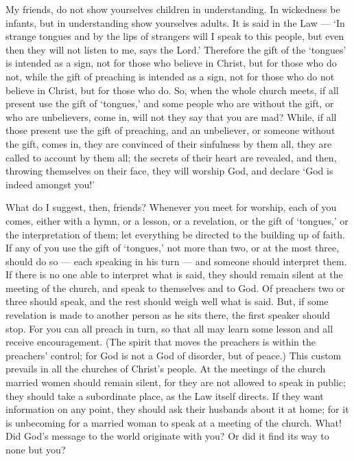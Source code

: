  My friends, do not show yourselves children in
understanding. In wickedness be infants, but in understanding show
yourselves adults.  It is said in the Law --- `In strange
tongues and by the lips of strangers will I speak to this people, but
even then they will not listen to me, says the Lord.' 
Therefore the gift of the `tongues' is intended as a sign, not for those
who believe in Christ, but for those who do not, while the gift of
preaching is intended as a sign, not for those who do not believe in
Christ, but for those who do.  So, when the whole church
meets, if all present use the gift of `tongues,' and some people who are
without the gift, or who are unbelievers, come in, will not they say
that you are mad?  While, if all those present use the gift
of preaching, and an unbeliever, or someone without the gift, comes in,
they are convinced of their sinfulness by them all, they are called to
account by them all;  the secrets of their heart are
revealed, and then, throwing themselves on their face, they will worship
God, and declare `God is indeed amongst you!'

 What do I suggest, then, friends? Whenever you meet for
worship, each of you comes, either with a hymn, or a lesson, or a
revelation, or the gift of `tongues,' or the interpretation of them; let
everything be directed to the building up of faith.  If any
of you use the gift of `tongues,' not more than two, or at the most
three, should do so --- each speaking in his turn --- and someone should
interpret them.  If there is no one able to interpret what
is said, they should remain silent at the meeting of the church, and
speak to themselves and to God.  Of preachers two or three
should speak, and the rest should weigh well what is said. 
But, if some revelation is made to another person as he sits there, the
first speaker should stop.  For you can all preach in turn,
so that all may learn some lesson and all receive encouragement.
 (The spirit that moves the preachers is within the
preachers' control;  for God is not a God of disorder, but
of peace.) This custom prevails in all the churches of Christ's people.
 At the meetings of the church married women should remain
silent, for they are not allowed to speak in public; they should take a
subordinate place, as the Law itself directs.  If they want
information on any point, they should ask their husbands about it at
home; for it is unbecoming for a married woman to speak at a meeting of
the church.  What! Did God's message to the world originate
with you? Or did it find its way to none but you?

